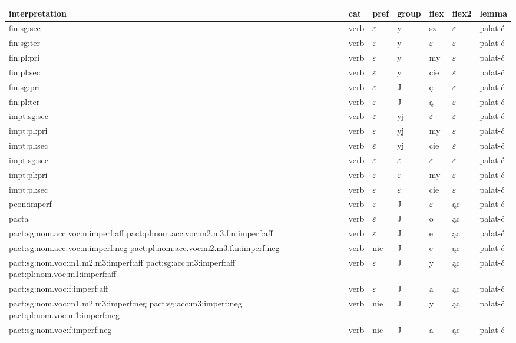 \documentclass{article}
\begin{document}
\begin{longtable}{p{7cm}|l|l|l|l|l|l}
interpretation & cat & pref & group & flex & flex2 & lemma\\
\hline
fin:sg:sec & verb & $\varepsilon$ & y & sz & $\varepsilon$ & palat-ć\\
fin:sg:ter & verb & $\varepsilon$ & y & $\varepsilon$ & $\varepsilon$ & palat-ć\\
fin:pl:pri & verb & $\varepsilon$ & y & my & $\varepsilon$ & palat-ć\\
fin:pl:sec & verb & $\varepsilon$ & y & cie & $\varepsilon$ & palat-ć\\
fin:sg:pri & verb & $\varepsilon$ & J & ę & $\varepsilon$ & palat-ć\\
fin:pl:ter & verb & $\varepsilon$ & J & ą & $\varepsilon$ & palat-ć\\
impt:sg:sec & verb & $\varepsilon$ & yj & $\varepsilon$ & $\varepsilon$ & palat-ć\\
impt:pl:pri & verb & $\varepsilon$ & yj & my & $\varepsilon$ & palat-ć\\
impt:pl:sec & verb & $\varepsilon$ & yj & cie & $\varepsilon$ & palat-ć\\
impt:sg:sec & verb & $\varepsilon$ & $\varepsilon$ & $\varepsilon$ & $\varepsilon$ & palat-ć\\
impt:pl:pri & verb & $\varepsilon$ & $\varepsilon$ & my & $\varepsilon$ & palat-ć\\
impt:pl:sec & verb & $\varepsilon$ & $\varepsilon$ & cie & $\varepsilon$ & palat-ć\\
pcon:imperf & verb & $\varepsilon$ & J & $\varepsilon$ & ąc & palat-ć\\
pacta & verb & $\varepsilon$ & J & o & ąc & palat-ć\\
pact:sg:nom.acc.voc:n:imperf:aff pact:pl:nom.acc.voc:m2.m3.f.n:imperf:aff & verb & $\varepsilon$ & J & e & ąc & palat-ć\\
pact:sg:nom.acc.voc:n:imperf:neg pact:pl:nom.acc.voc:m2.m3.f.n:imperf:neg & verb & nie & J & e & ąc & palat-ć\\
pact:sg:nom.voc:m1.m2.m3:imperf:aff pact:sg:acc:m3:imperf:aff pact:pl:nom.voc:m1:imperf:aff & verb & $\varepsilon$ & J & y & ąc & palat-ć\\
pact:sg:nom.voc:f:imperf:aff & verb & $\varepsilon$ & J & a & ąc & palat-ć\\
pact:sg:nom.voc:m1.m2.m3:imperf:neg pact:sg:acc:m3:imperf:neg pact:pl:nom.voc:m1:imperf:neg & verb & nie & J & y & ąc & palat-ć\\
pact:sg:nom.voc:f:imperf:neg & verb & nie & J & a & ąc & palat-ć\\

\end{longtable}
\end{document}
